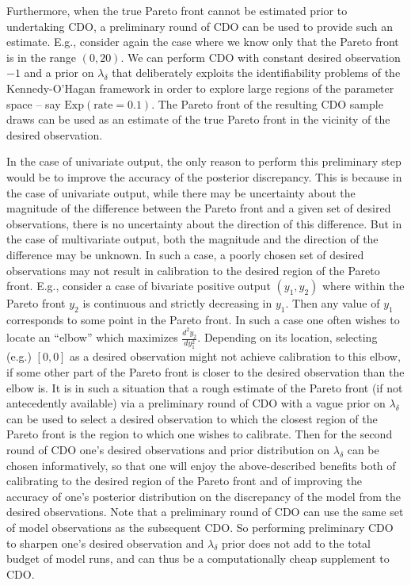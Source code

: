 \documentclass{article}
\begin{document}
Furthermore, when the true Pareto front cannot be estimated prior to undertaking CDO, a preliminary round of CDO can be used to provide such an estimate.
%
E.g., consider again the case where we know only that the Pareto front is in the range $(0,20)$. 
%
We can perform CDO with constant desired observation $-1$ and a prior on $\lambda_\delta$ that deliberately exploits the identifiability problems of the Kennedy-O'Hagan framework in order to explore large regions of the parameter space -- say $\mathrm{Exp}(\mathrm{rate}=0.1)$. 
%
The Pareto front of the resulting CDO sample draws can be used as an estimate of the true Pareto front in the vicinity of the desired observation.
%

In the case of univariate output, the only reason to perform this preliminary step would be to improve the accuracy of the posterior discrepancy. 
%
This is because in the case of univariate output, while there may be uncertainty about the magnitude of the difference between the Pareto front and a given set of desired observations, there is no uncertainty about the direction of this difference.
%
But in the case of multivariate output, both the magnitude and the direction of the difference may be unknown.
%
In such a case, a poorly chosen set of desired observations may not result in calibration to the desired region of the Pareto front.
%
E.g., consider a case of bivariate positive output $(y_1,y_2)$ where within the Pareto front $y_2$ is continuous and strictly decreasing in $y_1$. 
%
Then any value of $y_1$ corresponds to some point in the Pareto front.
%
In such a case one often wishes to locate an ``elbow'' which maximizes $\frac{d^2 y_2}{dy_1^2}$.
%
Depending on its location, selecting (e.g.) $[0,0]$ as a desired observation might not achieve calibration to this elbow, if some other part of the Pareto front is closer to the desired observation than the elbow is.
%
It is in such a situation that a rough estimate of the Pareto front (if not antecedently available) via a preliminary round of CDO with a vague prior on $\lambda_\delta$ can be used to select a desired observation to which the closest region of the Pareto front is the region to which one wishes to calibrate.
%
Then for the second round of CDO one's desired observations and prior distribution on $\lambda_\delta$ can be chosen informatively, so that one will enjoy the above-described benefits both of calibrating to the desired region of the Pareto front and of improving the accuracy of one's posterior distribution on the discrepancy of the model from the desired observations.
%
Note that a preliminary round of CDO can use the same set of model observations as the subsequent CDO.
%
So performing preliminary CDO to sharpen one's desired observation and $\lambda_\delta$ prior does not add to the total budget of model runs, and can thus be a computationally cheap supplement to CDO.
\end{document}
